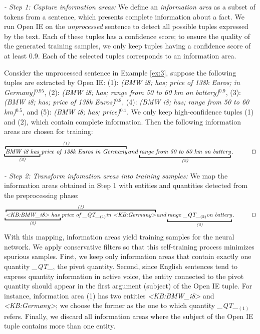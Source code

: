 \noindent \textit{- Step 1: Capture information areas:} We define an \textit{information area} as a subset of tokens from a sentence, which presents complete information about a fact.
We run Open IE on the \textit{unprocessed} sentence to detect all possible tuples expressed by the text. 
Each of these tuples has a confidence score; to ensure the quality of the generated training samples, 
we only keep tuples having a confidence score of at least 0.9. 
Each of the selected tuples corresponds to an information area.
\begin{example} Consider the unprocessed sentence in Example \ref{ex:3}, suppose the following tuples are extracted by Open IE: (1): \textit{(BMW i8; has; price of 138k Euros; in Germany)$^{0.95}$}, (2): \textit{(BMW i8; has; range from 50 to 60 km on battery)$^{0.9}$}, (3): \textit{(BMW i8; has; price of 138k Euros)$^{0.8}$}, (4): \textit{(BMW i8; has; range from 50 to 60 km)$^{0.5}$}, and (5): \textit{(BMW i8; has; price)$^{0.1}$}. We only keep high-confidence tuples (1) and (2), which contain complete information. 
Then the following information areas are chosen for training:
{\small
\begin{align*}
\mathrlap{\underbracket{\phantom{\textit{BMW i8 has }}}_{\textit{(2)}}} \overbracket{\textit{BMW i8 has price of 138k Euros in Germany}}^{\textit{(1)}} and \underbracket{\textit{range from 50 to 60 km on battery}}_{\textit{(2)}} . \tag*{\qed}
\end{align*}
}
\end{example}
\noindent \textit{- Step 2: Transform infomation areas into training samples:} We map the information areas obtained in Step 1 with entities and quantities detected from the preprocessing phase:
{\small
\[
 \mathrlap{\underbracket{\phantom{\textit{<KB:BMW\_i8> has }}}_{\textit{(2)}}} \overbracket{\textit{<KB:BMW\_i8> has price of \_QT\_}_{(1)} \textit{in <KB:Germany>}}^{\textit{(1)}} and \underbracket{\textit{range \_QT\_}_{(2)} \textit{on battery}}_{\textit{(2)}} . \tag*{\qed}
\]
}
With this mapping, information areas yield training samples for the neural network. 
We apply conservative filters so that this self-training process minimizes spurious samples.
First, we keep only information areas that contain exactly one quantity \textit{\_QT\_}, the pivot quantity. 
Second, since English sentences tend to express quantity information in active voice, 
the entity connected to the pivot quantity should appear in the first argument (subject) of the Open IE tuple. 
For instance, information area (1) has two entities \textit{<KB:BMW\_i8>} and \textit{<KB:Germany>};
we choose the former as the one to which quantity \textit{\_QT\_$_{(1)}$} refers. 
Finally, we discard all information areas where the subject of the Open IE tuple contains more than one entity.

